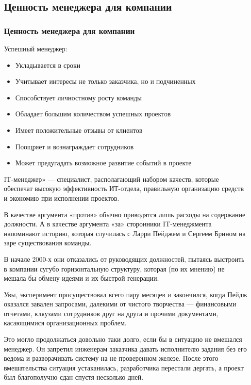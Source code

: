 \documentclass{../industrial-development}
\begin{document}
\subsection{Ценность менеджера для компании}
\begin{frame} \frametitle{Ценность менеджера для компании}
 \begin{block}{Успешный менеджер:}
\begin{itemize}
  \item Укладывается в сроки
  \item Учитывает интересы не только заказчика, но и подчиненных 
  \item Способствует личностному росту команды
  \item Обладает большим количеством успешных проектов
  \item Имеет положительные отзывы от клиентов
  \item Поощряет и вознаграждает сотрудников
  \item Может предугадать возможное развитие событий в проекте

  \end{itemize}
 \end{block}
\end{frame}
\lecturenotes
IT-менеджер» — специалист, располагающий набором качеств, которые обеспечат высокую эффективность ИТ-отдела, правильную организацию средств и экономию при исполнении проектов.

В качестве аргумента «против» обычно приводятся лишь расходы на содержание должности. А в качестве аргумента «за» сторонники IT-менеджмента напоминают историю, которая случилась с Ларри Пейджем и Сергеем Брином на заре существования команды.

В начале 2000-х они отказались от руководящих должностей, пытаясь выстроить в компании сугубо горизонтальную структуру, которая (по их мнению) не мешала бы обмену идеями и их быстрой генерации.

Увы, эксперимент просуществовал всего пару месяцев и закончился, когда Пейдж оказался завален запросами, далекими от чистого творчества — финансовыми отчетами, кляузами сотрудников друг на друга и прочими документами, касающимися организационных проблем.


Это могло продолжаться довольно таки долго, если бы в ситуацию не вмешался менеджер. Он запретил инженерам заказчика давать исполнителю задания без его ведома и разворачивать систему на не проверенном железе. После этого вмешательства ситуация устаканилась, разработчика перестали дергать, а проект был благополучно сдан спустя несколько дней.
\end{document}
